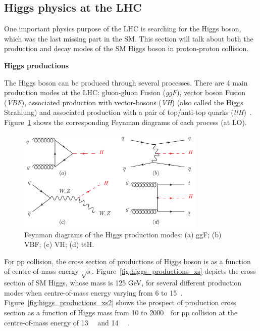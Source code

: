 \subsection{Higgs physics at the LHC}
\label{higgs}

One important physics purpose of the LHC is searching for the Higgs boson, which was the last missing part in the SM.
This section will talk about both the production and decay modes of the SM Higgs boson in proton-proton collision.

\textbf{Higgs productions}

The Higgs boson can be produced through several processes.
There are 4 main production modes at the LHC: gluon-gluon Fusion (\textit{ggF}), vector boson Fusion (\textit{VBF}),
associated production with vector-bosons (\textit{VH}) (also called the Higgs Strahlung) 
and associated production with a pair of top/anti-top quarks (\textit{ttH})~\cite{Grojean:2243593}.
Figure~\ref{fig:higgs_productions_fd} shows the corresponding Feynman diagrams of each process (at LO).
\begin{figure}[!htb]
  \centering
  \includegraphics[width=0.8\textwidth]{figures/Theory/Figures_FeynmanHprod.png}
  \caption{Feynman diagrams of the Higgs production modes:
	   (a) ggF; (b) VBF; (c) VH; (d) ttH.}
  \label{fig:higgs_productions_fd}
\end{figure}
For pp collision, the cross section of productions of Higgs boson is as a function of centre-of-mass energy $\sqrt{s}$. 
Figure~\ref{fig:higgs_productions_xs} depicts the cross section of SM Higgs, whose mass is 125 GeV, for several different production modes when centre-of-mass energy varying from 6 to 15~\tev.
Figure~\ref{fig:higgs_productions_xs2} shows the prospect of production cross section  
as a function of Higgs mass from 10 to 2000~\gev~for pp collision at the centre-of-mass energy of 13~\tev~ and 14~\tev~ \cite{deFlorian:2227475}. 
